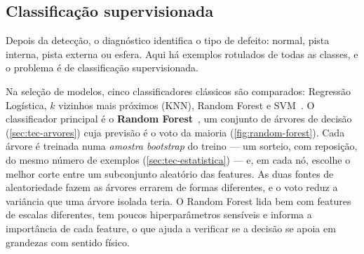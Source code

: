 \subsection{Classificação supervisionada}
\label{sec:tec-classificacao}

Depois da detecção, o diagnóstico identifica o tipo de defeito: normal, pista
interna, pista externa ou esfera. Aqui há exemplos rotulados de todas as classes,
e o problema é de classificação supervisionada.

Na seleção de modelos, cinco classificadores clássicos são comparados:
Regressão Logística, $k$ vizinhos mais próximos (KNN), Random Forest e SVM~\cite{hastie2009}. O classificador principal é o \textbf{Random
Forest}~\cite[cap.~15]{hastie2009}, um conjunto de árvores de decisão
(\autoref{sec:tec-arvores}) cuja previsão é o voto da maioria
(\autoref{fig:random-forest}). Cada árvore é treinada numa \emph{amostra
bootstrap} do treino --- um sorteio, com reposição, do mesmo número de exemplos
(\autoref{sec:tec-estatistica}) --- e, em cada nó, escolhe o melhor corte entre
um subconjunto aleatório das features. As duas fontes de aleatoriedade fazem as
árvores errarem de formas diferentes, e o voto reduz a variância que uma árvore
isolada teria. O Random Forest lida bem com features de escalas diferentes, tem
poucos hiperparâmetros sensíveis e informa a importância de cada feature, o que
ajuda a verificar se a decisão se apoia em grandezas com sentido físico.

